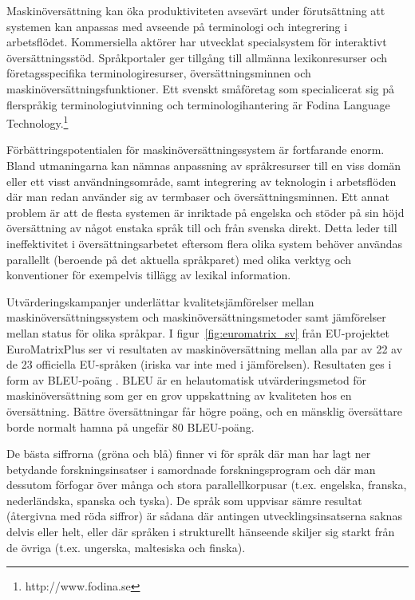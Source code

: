 \begin{multicols}{2}

Maskinöversättning kan öka produktiviteten avsevärt under
förutsättning att systemen kan an\-pas\-sas med avseende på
terminologi och integrering i arbetsflödet. Kommersiella aktörer har
utvecklat specialsystem för interaktivt
översättningsstöd. Språkportaler ger tillgång till allmänna
lexikonresurser och företagsspecifika terminologiresurser,
översättningsminnen och maskinöversättningsfunktioner. Ett svenskt
småföretag som specialicerat sig på flerspråkig terminologiutvinning
och terminologihantering är Fodina Language
Technology.\footnote{http://www.fodina.se}

Förbättringspotentialen för maskinöversättnings\-sys\-tem är fortfarande
enorm. Bland utmaningarna kan nämnas anpassning av språkresurser till
en viss domän eller ett visst användningsområde, samt integrering av
teknologin i arbetsflöden där man redan använder sig av termbaser och
översättningsminnen. Ett annat problem är att de flesta systemen är
inriktade på engelska och stöder på sin höjd översättning av något
enstaka språk till och från svenska direkt. Detta leder till
ineffektivitet i översättningsarbetet eftersom flera olika system
behöver användas parallellt (beroende på det aktuella språkparet) med
olika verktyg och konventioner för exempelvis tillägg av lexikal
information.

Utvärderingskampanjer underlättar kvalitetsjämförelser mellan
maskinöversättningssystem och maskinöversättningsmetoder samt
jämförelser mellan status för olika språkpar. I
figur~\ref{fig:euromatrix_sv} från EU-projektet EuroMatrixPlus ser vi
resultaten av maskinöversättning mellan alla par av 22 av de 23
officiella EU-språken (iriska var inte med i jämförelsen). Resultaten
ges i form av BLEU-poäng \cite{bleu1}. BLEU är en helautomatisk
utvärderingsmetod för maskinöversättning som ger en grov uppskattning
av kvaliteten hos en översättning. Bättre översättningar får högre
poäng, och en mänsklig översättare borde normalt hamna på ungefär 80
BLEU-poäng.

De bästa siffrorna (gröna och blå) finner vi för språk där man har
lagt ner betydande forskningsinsatser i samordnade forskningsprogram
och där man dessutom förfogar över många och stora parallellkorpusar
(t.ex. engelska, franska, nederländska, spanska och tyska). De språk
som uppvisar sämre resultat (återgivna med röda siffror) är sådana där
antingen utvecklingsinsatserna saknas delvis eller helt, eller där
språken i strukturellt hänseende skiljer sig starkt från de övriga
(t.ex. ungerska, maltesiska och finska).



\end{multicols}
